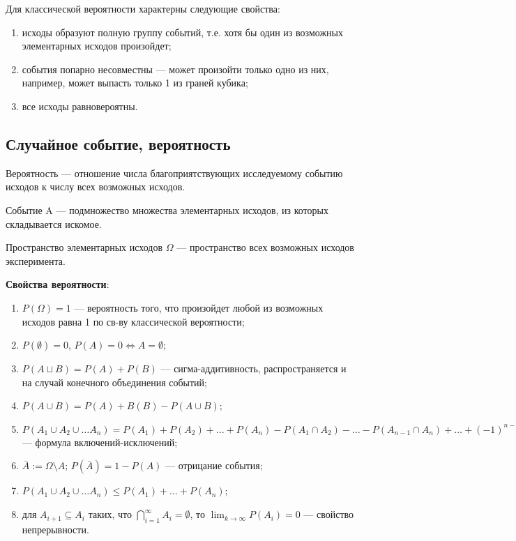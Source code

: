 Для классической вероятности характерны следующие свойства:
\begin{enumerate}
    \item исходы образуют полную группу событий, т.е. хотя бы один из возможных элементарных исходов произойдет;
    \item события попарно несовместны --- может произойти только одно из них, например, может выпасть только 1 из граней кубика;
    \item все исходы равновероятны.
\end{enumerate}

\subsection{Случайное событие, вероятность}

\begin{definition}[Вероятность]
    Вероятность --- отношение числа благоприятствующих исследуемому событию исходов к числу всех возможных исходов.
\end{definition}

\begin{definition}[Событие]
    Событие A --- подмножество множества элементарных исходов, из которых складывается искомое.
\end{definition}

\begin{definition}
    Пространство элементарных исходов $\Omega$ --- пространство всех возможных исходов эксперимента.
\end{definition}

\textbf{Свойства вероятности}:
\begin{enumerate}
    \item $P(\Omega) = 1$ --- вероятность того, что произойдет любой из возможных исходов равна 1 по св-ву классической вероятности;
    \item $P(\emptyset) = 0$, $P(A) = 0 \Leftrightarrow  A = \emptyset$;
    \item $P(A \sqcup B) = P(A) + P(B)$ --- сигма-аддитивность, распространяется и на случай конечного объединения событий;
    \item $P(A \cup B) = P(A) + B(B) - P(A \cup B)$;
    \item $P(A_1 \cup A_2 \cup \ldots A_n) = P(A_1) + P(A_2) + \ldots + P(A_n) - P(A_1 \cap A_2) - \ldots - P(A_{n-1} \cap A_n) + \ldots + (-1)^{n-1} P(A_1 \cap \ldots \cap A_n)$ --- формула включений-исключений;
    \item $\bar{A} := \Omega \setminus A$; $P(\bar{A}) = 1 - P(A)$ --- отрицание события; 
    \item $P(A_1 \cup A_2 \cup \ldots A_n) \leq P(A_1) + \ldots + P(A_n)$;
    \item для $A_{i+1} \subseteq A_i$ таких, что $\bigcap_{i=1}^{\infty} A_i = \emptyset$, то $\lim_{k \to \infty} P(A_i) = 0$ --- свойство непрерывности. 
\end{enumerate}

